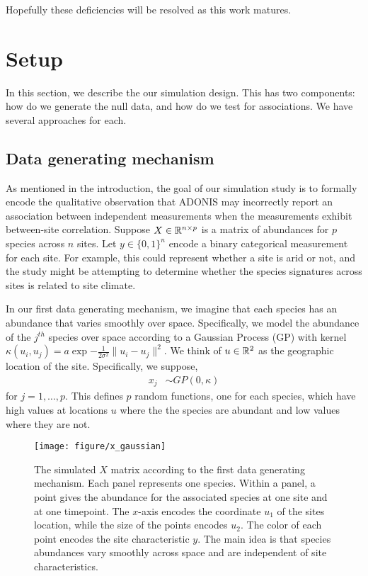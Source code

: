\documentclass{article}
\begin{document}
Hopefully these deficiencies will be resolved as this work matures.

\section{Setup}
\label{sec:setup}

In this section, we describe the our simulation design. This has two components:
how do we generate the null data, and how do we test for associations. We have
several approaches for each.

\subsection{Data generating mechanism}
\label{subsec:data_generating_mechanism}

As mentioned in the introduction, the goal of our simulation study is to
formally encode the qualitative observation that ADONIS may incorrectly report
an association between independent measurements when the measurements exhibit
between-site correlation. Suppose $X \in \mathbb{R}^{n \times p}$ is a matrix of
abundances for $p$ species across $n$ sites. Let $y \in \{0, 1\}^{n}$ encode a
binary categorical measurement for each site. For example, this could represent
whether a site is arid or not, and the study might be attempting to determine
whether the species signatures across sites is related to site climate.

In our first data generating mechanism, we imagine that each species has an
abundance that varies smoothly over space. Specifically, we model the abundance
of the $j^{th}$ species over space according to a Gaussian Process (GP) with
kernel
$\kappa\left(u_{i}, u_{j}\right) = a\exp{-\frac{1}{2\sigma^{2}}\|u_{i} - u_{j}\|^{2}}$.
We think of $u \in \mathbb{R}^{2}$ as the geographic location of the site.
Specifically, we suppose,
\begin{align}
  x_{j} &\sim GP\left(0, \kappa\right)
\end{align}
for $j = 1, \dots, p$. This defines $p$ random functions, one for each species,
which have high values at locations $u$ where the the species are abundant and
low values where they are not.

\begin{figure}
  \centering
  \texttt{[image: figure/x\_gaussian]}
  \caption{\label{fig:x_gaussian} The simulated $X$ matrix according to the
    first data generating mechanism. Each panel represents one species. Within a
    panel, a point gives the abundance for the associated species at one site
    and at one timepoint. The $x$-axis encodes the coordinate $u_{1}$ of the
    sites location, while the size of the points encodes $u_{2}$. The color of
    each point encodes the site characteristic $y$. The main idea is that
    species abundances vary smoothly across space and are independent of site
    characteristics.}
\end{figure}
\end{document}
